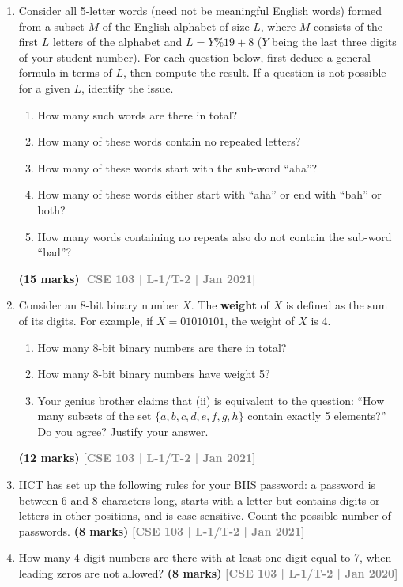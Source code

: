 \documentclass[12pt,a3paper]{article}
\newcommand{\yr}[1]{\hfill\textcolor{gray}{\small\textbf{[#1]}}}
\newcommand{\mk}[1]{\textcolor{orange!70!black}{\small\textbf{(#1 marks)}}}
\begin{document}
\begin{enumerate}
\item Consider all 5-letter words (need not be meaningful English words) formed from a subset $M$ of the English alphabet of size $L$, where $M$ consists of the first $L$ letters of the alphabet and $L = Y\%19 + 8$ ($Y$ being the last three digits of your student number). For each question below, first deduce a general formula in terms of $L$, then compute the result. If a question is not possible for a given $L$, identify the issue.
\begin{enumerate}
  \item How many such words are there in total?
  \item How many of these words contain no repeated letters?
  \item How many of these words start with the sub-word ``aha''?
  \item How many of these words either start with ``aha'' or end with ``bah'' or both?
  \item How many words containing no repeats also do not contain the sub-word ``bad''?
\end{enumerate}
\mk{15} \yr{CSE 103 | L-1/T-2 | Jan 2021}

\item Consider an 8-bit binary number $X$. The \textbf{weight} of $X$ is defined as the sum of its digits. For example, if $X = 01010101$, the weight of $X$ is 4.
\begin{enumerate}
  \item How many 8-bit binary numbers are there in total?
  \item How many 8-bit binary numbers have weight 5?
  \item Your genius brother claims that (ii) is equivalent to the question: ``How many subsets of the set $\{a, b, c, d, e, f, g, h\}$ contain exactly 5 elements?'' Do you agree? Justify your answer.
\end{enumerate}
\mk{12} \yr{CSE 103 | L-1/T-2 | Jan 2021}

\item IICT has set up the following rules for your BIIS password: a password is between 6 and 8 characters long, starts with a letter but contains digits or letters in other positions, and is case sensitive. Count the possible number of passwords.
\mk{8} \yr{CSE 103 | L-1/T-2 | Jan 2021}

\item How many 4-digit numbers are there with at least one digit equal to 7, when leading zeros are not allowed?
\mk{8} \yr{CSE 103 | L-1/T-2 | Jan 2020}


\end{enumerate}
\end{document}
